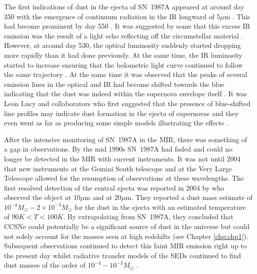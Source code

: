 The first indications of dust in the ejecta of SN~1987A appeared at around day 350 with the emergence of continuum radiation in the IR longward of 5$\mu$m \citep{Meikle1993}.  This had become prominent by day 550 \citep{Roche1993,Wooden1993}.  It was suggested by some that this excess IR emission was the result of  a light echo reflecting off the circumstellar material \citep{Roche1989}.  However, at around day 530, the optical luminosity suddenly started dropping more rapidly than it had done previously.  At the same time, the IR luminosity started to increase ensuring that the bolometric light curve continued to follow the same trajectory \citep{Suntzeff1991,Whitelock1991}.  At the same time it was observed that the peaks of several emission lines in the optical and IR had become shifted towards the blue indicating that the dust was indeed within the supernova envelope itself \citep{Danziger1991a,Danziger1991,Meikle1991,Meikle1993,Suntzeff1991,Hanuschik1993}.  It was Leon Lucy and collaborators who first suggested that the presence of blue-shifted line profiles may indicate dust formation in the ejecta of supernovae and they even went as far as producing some simple models illustrating the effects \citep{Lucy1989,Lucy1991}.  

After the intensive monitoring of SN~1987A in the MIR, there was something of a gap in observations.  By the mid 1990s SN~1987A had faded and could no longer be detected in the MIR with current instruments.  It was not until 2004 that new instruments at the Gemini South telescope and at the Very Large Telescope allowed for the resumption of observations at these wavelengths.  The first resolved detection of the central ejecta was reported in 2004 by \citet{Bouchet2004} who observed the object at 10$\mu$m and at $20\mu$m. They reported a dust mass estimate of $10^{-4}M_{\odot}-2 \times 10^{-3}M_{\odot}$ for the dust in the ejecta with an estimated temperature of $90K<T<100K$.  By extrapolating from SN~1987A, they concluded that CCSNe could potentially be a significant source of dust in the universe but could not solely account for the masses seen at high redshifts (see Chapter \ref{chp:chp1}).  Subsequent observations continued to detect this faint MIR emission right up to the present day \citep{Dwek2010,Bouchet2014} whilst radiative transfer models of the SEDs continued to find dust masses of the order of $10^{-4}-10^{-3}M_{\odot}$ \citep{Ercolano2007}.

